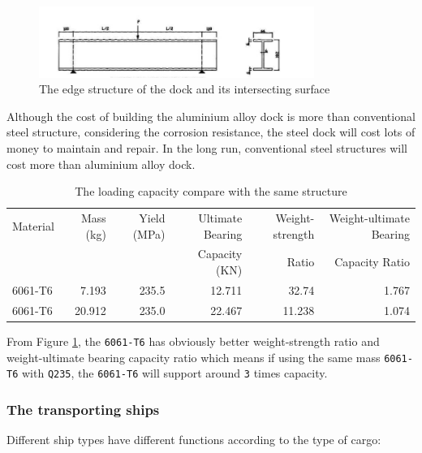 \documentclass[11pt]{article}
\numberwithin{equation}{section}
\begin{document}
\begin{figure}[H]
\centering
\includegraphics[width=0.8\textwidth]{Figures/constructing_structure2.jpg}
\caption{\label{constructing_structure2}The edge structure of the dock and its intersecting surface}
\end{figure}

Although the cost of building the aluminium alloy dock is more than conventional steel structure, considering the corrosion resistance, the steel dock will cost lots of money to maintain and repair. In the long run, conventional steel structures will cost more than aluminium alloy dock.

\begin{table}[H]
\caption{\label{The_loading_capacity_compare_with_the_same_structure}The loading capacity compare with the same structure \cite{10.2749/101686606778995164}}
\centering
\begin{tabular}{lrrrrr}
\toprule
Material & Mass (kg) & Yield (MPa) & Ultimate Bearing & Weight-strength & Weight-ultimate Bearing\\
 &  &  & Capacity (KN) & Ratio & Capacity Ratio\\
\midrule
6061-T6 & 7.193 & 235.5 & 12.711 & 32.74 & 1.767\\
6061-T6 & 20.912 & 235.0 & 22.467 & 11.238 & 1.074\\
\bottomrule
\end{tabular}
\end{table}

From Figure \ref{The_loading_capacity_compare_with_the_same_structure}, the \texttt{6061-T6} has obviously better weight-strength ratio and weight-ultimate bearing capacity  ratio which means if using the same mass \texttt{6061-T6} with \texttt{Q235}, the \texttt{6061-T6} will support around \texttt{3} times capacity.

\subsubsection{The transporting ships}
\label{sec:org64aed6c}
Different ship types have different functions according to the type of cargo:
\end{document}
